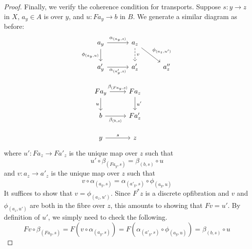 \begin{proof}
  Finally, we verify the coherence condition for transports.
  Suppose $s : y \to z$ in $X$, $a_y \in A$ is over $y$, and $u : F a_y \to b$ in $B$.
  We generate a similar diagram as before:
  \[
  \begin{tikzcd}
    {a_y} & {a_z} & \\
    {a_y'} & {a'_z} & {a''_z} \\
    {F a_y} & {F a_z} \\
    b & {F a'_z} \\
    y & z
    \arrow["{{{{\alpha_{(a_y,s)}}}}}", from=1-1, to=1-2]
    \arrow["{{{{\phi_{(a_y,u)}}}}}"', from=1-1, to=2-1]
    \arrow["v", dashed, from=1-2, to=2-2]
    \arrow["{{{{\phi_{(a_z,u')}}}}}", from=1-2, to=2-3]
    \arrow["{{{{\alpha_{(a'_y,s)}}}}}"', from=2-1, to=2-2]
    \arrow["{{{{\beta_{(F a_y, s)}}}}}", from=3-1, to=3-2]
    \arrow["u"', from=3-1, to=4-1]
    \arrow["{{{u'}}}", from=3-2, to=4-2]
    \arrow["{{{{\beta_{(b, s)}}}}}"', from=4-1, to=4-2]
    \arrow["s", from=5-1, to=5-2]
  \end{tikzcd}
  \]
  where $u' : F a_z \to F a'_z$ is the unique map over $z$ such that
  \[u' \circ \beta_{(F a_y, s)} = \beta_{(b,s)} \circ u\]
  and $v : a_z \to a'_z$ is the unique map over $z$ such that
  \[v \circ \alpha_{(a_y,s)} = \alpha_{(a'_y,s)} \circ \phi_{(a_y,u)}\]
  It suffices to show that $v = \phi_{(a_z,u')}$.
  Since $F^* z$ is a discrete opfibration
  and $v$ and $\phi_{(a_z,u')}$ are both in the fibre over $z$,
  this amounts to showing that $F v = u'$.
  By definition of $u'$, we simply need to check the following.
  \[
    F v \circ \beta_{(F a_y, s)}
    = F (v \circ \alpha_{(a_y,s)})
    = F (\alpha_{(a'_y,s)} \circ \phi_{(a_y,u)})
    = \beta_{(b,s)} \circ u
  \]
\end{proof}

